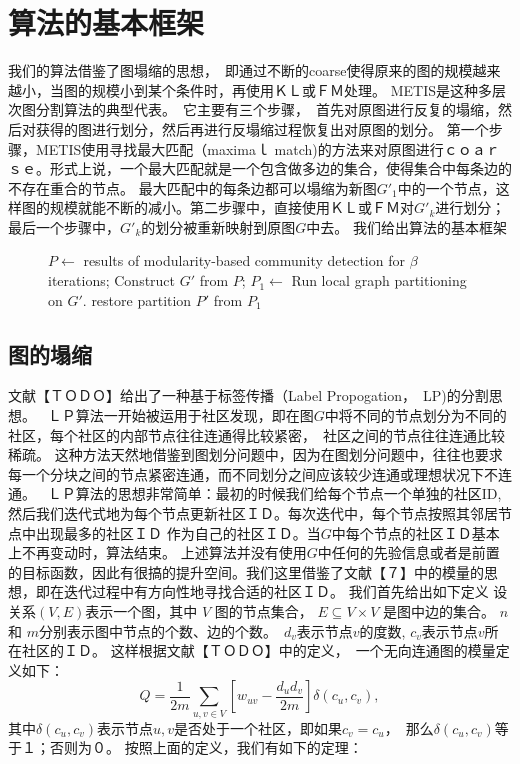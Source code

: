 \documentclass[master]{njuthesis}
\begin{document}
\section{算法的基本框架}
我们的算法借鉴了图塌缩的思想，　即通过不断的coarse使得原来的图的规模越来越小，当图的规模小到某个条件时，再使用ＫＬ或ＦＭ处理。
METIS是这种多层次图分割算法的典型代表。　它主要有三个步骤，　首先对原图进行反复的塌缩，然后对获得的图进行划分，然后再进行反塌缩过程恢复出对原图的划分。
第一个步骤，METIS使用寻找最大匹配（maximaｌ match)的方法来对原图进行ｃｏａｒｓｅ。形式上说，一个最大匹配就是一个包含做多边的集合，使得集合中每条边的不存在重合的节点。
最大匹配中的每条边都可以塌缩为新图$G\prime_1$中的一个节点，这样图的规模就能不断的减小。第二步骤中，直接使用ＫＬ或ＦＭ对$G\prime_k$进行划分；
最后一个步骤中，$G\prime_k$的划分被重新映射到原图$G$中去。
我们给出算法的基本框架
\begin{figure}
\begin{algorithm}[H]
\label{alg:mlgp}
\begin{algorithmic}[1]
		\State $P \gets $ results of modularity-based community detection for $\beta$ iterations;
		\State Construct $G\prime$ from $P$;
	\EndWhile
	\State $P_1 \gets $ Run local graph partitioning on $G\prime$. 
	\State restore partition $P\prime$ from $P_1$
\EndProcedure
\end{algorithmic}
\end{algorithm}
\end{figure}

\subsection{图的塌缩}
文献【ＴＯＤＯ】给出了一种基于标签传播（Label Propogation，　LP)的分割思想。　
ＬＰ算法一开始被运用于社区发现，即在图$G$中将不同的节点划分为不同的社区，每个社区的内部节点往往连通得比较紧密，　社区之间的节点往往连通比较稀疏。
这种方法天然地借鉴到图划分问题中，因为在图划分问题中，往往也要求每一个分块之间的节点紧密连通，而不同划分之间应该较少连通或理想状况下不连通。　
ＬＰ算法的思想非常简单：最初的时候我们给每个节点一个单独的社区ID, 然后我们迭代式地为每个节点更新社区ＩＤ。每次迭代中，每个节点按照其邻居节点中出现最多的社区ＩＤ
作为自己的社区ＩＤ。当$G$中每个节点的社区ＩＤ基本上不再变动时，算法结束。
上述算法并没有使用$G$中任何的先验信息或者是前置的目标函数，因此有很搞的提升空间。我们这里借鉴了文献【７】中的模量的思想，即在迭代过程中有方向性地寻找合适的社区ＩＤ。
我们首先给出如下定义
设关系$(V, E)$表示一个图，其中 $V$ 图的节点集合， $E \subseteq V \times V$ 是图中边的集合。
$n$ 和 $m$分别表示图中节点的个数、边的个数。　$d_v$表示节点$v$的度数, $c_v$表示节点$v$所在社区的ＩＤ。
这样根据文献【ＴＯＤＯ】中的定义，　一个无向连通图的模量定义如下：
\begin{equation}\label{eq:modularity}
Q = \frac{1}{2m}\sum\limits_{u, v \in V} \left[w_{uv} - \frac{{d_u}{d_v}}{2m} \right]\delta(c_u, c_v),
\end{equation}
其中$\delta(c_u, c_v)$表示节点$u, v$是否处于一个社区，即如果$c_v = c_u$，　那么$\delta(c_u, c_v)$等于１；否则为０。
按照上面的定义，我们有如下的定理：
\end{document}
